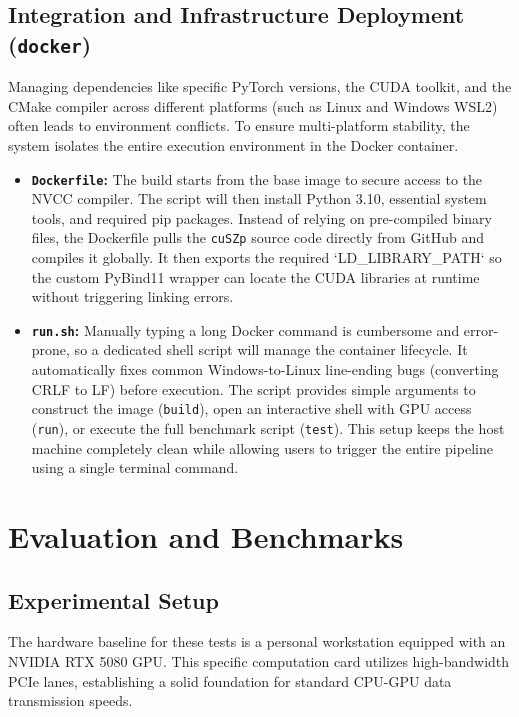 \documentclass{polyu-comp}
\begin{document}
\subsection{Integration and Infrastructure Deployment (\texttt{docker})}
\label{subsec:docker_deployment}

Managing dependencies like specific PyTorch versions, the CUDA toolkit, and the CMake compiler across different platforms (such as  Linux and Windows WSL2) often leads to environment conflicts. To ensure multi-platform stability, the system isolates the entire execution environment in the Docker container.

\begin{itemize}
    \item \textbf{\texttt{Dockerfile}:} The build starts from the  base image to secure access to the NVCC compiler. The script will then install Python 3.10, essential system tools, and required pip packages. Instead of relying on pre-compiled binary files, the Dockerfile pulls the \texttt{cuSZp} source code directly from GitHub and compiles it globally. It then exports the required `LD\_LIBRARY\_PATH` so the custom PyBind11 wrapper can locate the CUDA libraries at runtime without triggering linking errors.
    
    \item \textbf{\texttt{run.sh}:} Manually typing a long Docker command is cumbersome and error-prone, so a dedicated shell script will manage the container lifecycle. It automatically fixes common Windows-to-Linux line-ending bugs (converting CRLF to LF) before execution. The script provides simple arguments to construct the image (\texttt{build}), open an interactive shell with GPU access (\texttt{run}), or execute the full benchmark script (\texttt{test}). This setup keeps the host machine completely clean while allowing users to trigger the entire pipeline using a single terminal command.
\end{itemize}


\section{Evaluation and Benchmarks}
\label{sec:evaluation_benchmarks}

\subsection{Experimental Setup}
The hardware baseline for these tests is a personal workstation equipped with an NVIDIA RTX 5080 GPU. This specific computation card utilizes high-bandwidth PCIe lanes, establishing a solid foundation for standard CPU-GPU data transmission speeds. 
\end{document}
